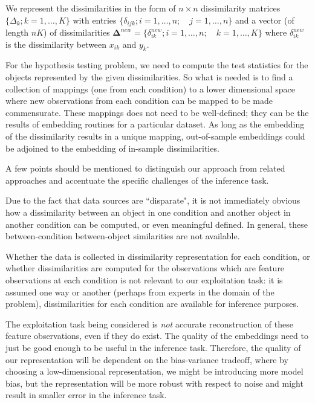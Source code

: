 \documentclass[12pt,oneside,final]{thesis}
\begin{document}
We represent the dissimilarities in the form  of $n \times n$  dissimilarity matrices $\{\Delta_k;k=1,\ldots,K\}$ with entries $\{\delta_{ijk} ;  i=1,\ldots,n;\quad j=1,\ldots,n\}$  and a  vector (of length $nK$) of dissimilarities  $\mathbf{\Delta}^{new}=\{ \delta_{ik}^{new}; i=1,\ldots, n;\quad k=1,\ldots,K\}  $  where $\delta_{ik}^{new} $ is the dissimilarity  between  $x_{ik}$ and $y_k$.
 
 
For the hypothesis testing problem, we need to compute the test statistics for the objects represented by the given dissimilarities. So what is needed is to find a collection of mappings (one from each condition) to a lower dimensional space where new observations from each condition can be mapped to be made commensurate. These mappings does not need to be  well-defined; they can be the results of embedding routines for a particular dataset. As long as the embedding of the dissimilarity results in a  unique mapping,  out-of-sample embeddings could be adjoined to the embedding of in-sample dissimilarities.

A few points should be mentioned to distinguish our approach from related approaches and accentuate the specific challenges of the inference task.
\begin{remark}
Due to the fact that data sources are ``disparate", it is not immediately obvious how  a dissimilarity between an object in one condition and another object in another condition  can be computed, or even meaningful defined.  In general, these between-condition between-object  similarities are not available.
\label{rem:between_cond_diss}
\end{remark}
 
 \begin{remark}
 Whether the data is collected in dissimilarity representation for each condition, or whether dissimilarities are computed for the observations which are feature observations at each condition is not relevant to our exploitation task: it is assumed one way or another (perhaps from experts in the domain of the problem),  dissimilarities for each condition are available for inference purposes. 
\end{remark}

\begin{remark}
The exploitation task  being considered is \emph{not} accurate reconstruction of these feature observations, even if they do exist. The quality of the  embeddings need to just be  good enough to be useful in the inference task. Therefore, the quality of our representation will be dependent on the bias-variance tradeoff, where by choosing a low-dimensional representation, we might be introducing more model bias, but the representation will be more  robust with respect to noise and might result in smaller error in the inference task.
\end{remark}
\end{document}
